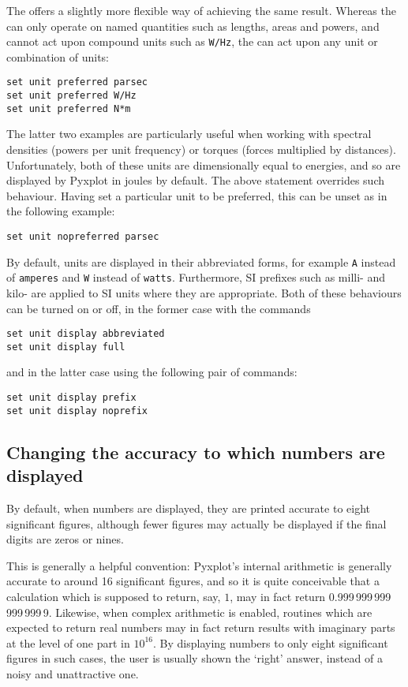 The  offers a slightly more flexible way of
achieving the same result. Whereas the  can only operate
on named quantities such as lengths, areas and powers, and cannot act upon
compound units such as {\tt W/Hz}, the  can act
upon any unit or combination of units:
\begin{verbatim}
set unit preferred parsec
set unit preferred W/Hz
set unit preferred N*m
\end{verbatim}
The latter two examples are particularly useful when working with spectral
densities (powers per unit frequency) or torques (forces multiplied by
distances). Unfortunately, both of these units are dimensionally equal to
energies, and so are displayed by Pyxplot in joules by default. The above
statement overrides such behaviour. Having set a particular unit to be
preferred, this can be unset as in the following example:
\begin{verbatim}
set unit nopreferred parsec
\end{verbatim}

By default, units are displayed in their abbreviated forms, for example {\tt A}
instead of {\tt amperes} and {\tt W} instead of {\tt watts}. Furthermore, SI
prefixes such as milli- and kilo- are applied to SI units where they are
appropriate. Both of these
behaviours can be turned on or off, in the former case with the commands

\begin{verbatim}
set unit display abbreviated
set unit display full
\end{verbatim}

\noindent and in the latter case using the following pair of commands:

\begin{verbatim}
set unit display prefix
set unit display noprefix
\end{verbatim}

\subsection{Changing the accuracy to which numbers are displayed}

By default, when numbers are displayed, they are printed accurate to eight
significant figures, although fewer figures may actually be displayed if the
final digits are zeros or nines.

This is generally a helpful convention: Pyxplot's internal arithmetic is
generally accurate to around 16 significant figures, and so it is quite
conceivable that a calculation which is supposed to return, say, $1$, may in
fact return 0.999\,999\,999\,999\,999\,9. Likewise, when complex arithmetic is
enabled, routines which are expected to return real numbers may in fact return
results with imaginary parts at the level of one part in $10^{16}$.  By
displaying numbers to only eight significant figures in such cases, the user is
usually shown the `right' answer, instead of a noisy and unattractive one.

